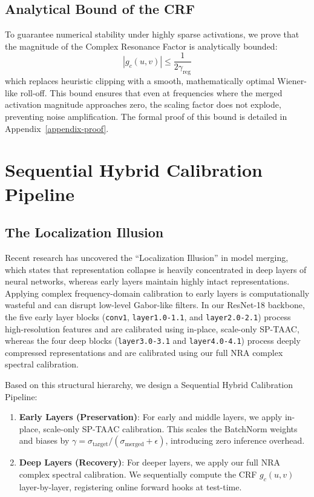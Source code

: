 \documentclass{article}
\theoremstyle{plain}
\theoremstyle{definition}
\theoremstyle{remark}
\begin{document}
\subsection{Analytical Bound of the CRF}
To guarantee numerical stability under highly sparse activations, we prove that the magnitude of the Complex Resonance Factor is analytically bounded:
\begin{equation}
    |g_c(u, v)| \leq \frac{1}{2 \gamma_{\text{reg}}}
\end{equation}
which replaces heuristic clipping with a smooth, mathematically optimal Wiener-like roll-off. This bound ensures that even at frequencies where the merged activation magnitude approaches zero, the scaling factor does not explode, preventing noise amplification. The formal proof of this bound is detailed in Appendix~\ref{appendix-proof}.

\section{Sequential Hybrid Calibration Pipeline}
\label{submission-pipeline}
\subsection{The Localization Illusion}
Recent research has uncovered the ``Localization Illusion'' in model merging, which states that representation collapse is heavily concentrated in deep layers of neural networks, whereas early layers maintain highly intact representations. Applying complex frequency-domain calibration to early layers is computationally wasteful and can disrupt low-level Gabor-like filters. In our ResNet-18 backbone, the five early layer blocks (\texttt{conv1}, \texttt{layer1.0-1.1}, and \texttt{layer2.0-2.1}) process high-resolution features and are calibrated using in-place, scale-only SP-TAAC, whereas the four deep blocks (\texttt{layer3.0-3.1} and \texttt{layer4.0-4.1}) process deeply compressed representations and are calibrated using our full NRA complex spectral calibration.

Based on this structural hierarchy, we design a Sequential Hybrid Calibration Pipeline:
\begin{enumerate}
    \item \textbf{Early Layers (Preservation)}: For early and middle layers, we apply in-place, scale-only SP-TAAC calibration. This scales the BatchNorm weights and biases by $\gamma = \sigma_{\text{target}} / (\sigma_{\text{merged}} + \epsilon)$, introducing zero inference overhead.
    \item \textbf{Deep Layers (Recovery)}: For deeper layers, we apply our full NRA complex spectral calibration. We sequentially compute the CRF $g_c(u, v)$ layer-by-layer, registering online forward hooks at test-time.
\end{enumerate}
\end{document}
